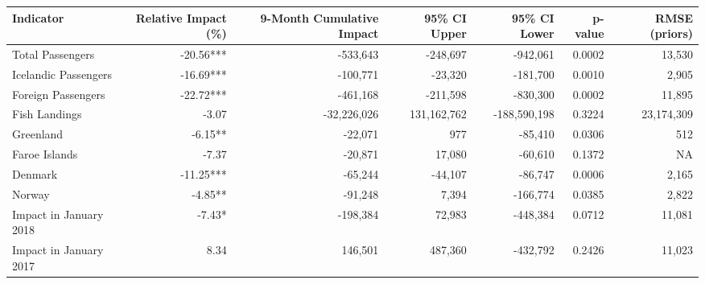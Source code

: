 \begin{tabular}[t]{lrrrrrr}
\toprule
Indicator & Relative Impact (\%) & 9-Month Cumulative Impact & 95\% CI Upper & 95\% CI Lower & p-value & RMSE (priors)\\
\midrule
Total Passengers & -20.56*** & -533,643 & -248,697 & -942,061 & 0.0002 & 13,530\\
Icelandic Passengers & -16.69*** & -100,771 & -23,320 & -181,700 & 0.0010 & 2,905\\
Foreign Passengers & -22.72*** & -461,168 & -211,598 & -830,300 & 0.0002 & 11,895\\
\midrule
Fish Landings & -3.07 & -32,226,026 & 131,162,762 & -188,590,198 & 0.3224 & 23,174,309\\
\midrule
Greenland & -6.15** & -22,071 & 977 & -85,410 & 0.0306 & 512\\
Faroe Islands & -7.37 & -20,871 & 17,080 & -60,610 & 0.1372 & NA\\
Denmark & -11.25*** & -65,244 & -44,107 & -86,747 & 0.0006 & 2,165\\
Norway & -4.85** & -91,248 & 7,394 & -166,774 & 0.0385 & 2,822\\
\midrule
Impact in January 2018 & -7.43* & -198,384 & 72,983 & -448,384 & 0.0712 & 11,081\\
Impact in January 2017 & 8.34 & 146,501 & 487,360 & -432,792 & 0.2426 & 11,023\\
\bottomrule
\end{tabular}
